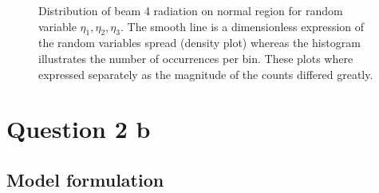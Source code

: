 \documentclass[a4paper,11pt]{article}
\begin{document}
\begin{figure}[!tbp]
  \centering
  \hfill
  \caption{Distribution of beam 4 radiation on normal region for random variable $\eta_1,\eta_2,\eta_3$. The smooth line is a dimensionless expression of the random variables spread (density plot) whereas the histogram illustrates the number of occurrences per bin. These plots where expressed separately as the magnitude of the counts differed greatly.}
  \label{fig:q2a.eta}
\end{figure}


\newpage 

\section{Question 2 b}

\subsection{Model formulation}
\end{document}
